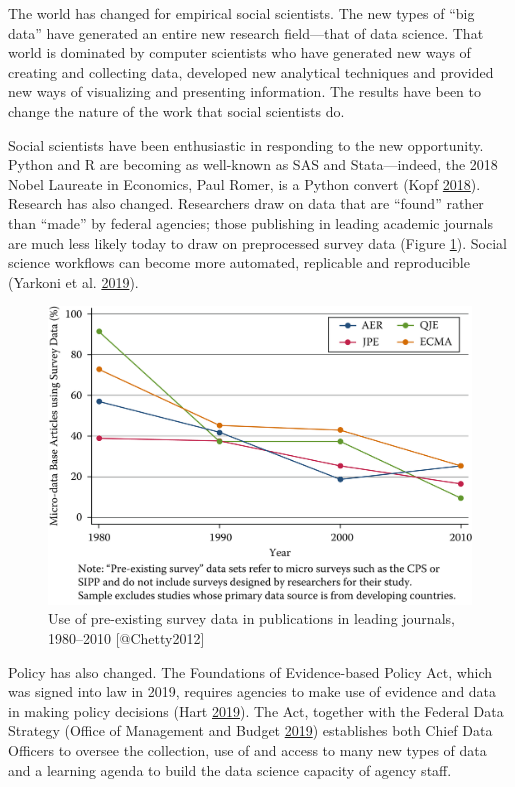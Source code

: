 \documentclass[]{krantz}
\begin{document}
The world has changed for empirical social scientists. The new types of
``big data'' have generated an entire new research field---that of data
science. That world is dominated by computer scientists who have
generated new ways of creating and collecting data, developed new
analytical techniques and provided new ways of visualizing and
presenting information. The results have been to change the nature of
the work that social scientists do.

Social scientists have been enthusiastic in responding to the new
opportunity. Python and R are becoming as well-known as SAS and
Stata---indeed, the 2018 Nobel Laureate in Economics, Paul Romer, is a
Python convert (Kopf \protect\hyperlink{ref-Kopf}{2018}). Research has
also changed. Researchers draw on data that are ``found'' rather than
``made'' by federal agencies; those publishing in leading academic
journals are much less likely today to draw on preprocessed survey data
(Figure \ref{fig:fig1}). Social science workflows can become more
automated, replicable and reproducible (Yarkoni et al.
\protect\hyperlink{ref-Yarkoni2019}{2019}).

\begin{figure}

{\centering \includegraphics[width=0.7\linewidth]{ChapterIntro/figures/Figure1} 

}

\caption{Use of pre-existing survey data in publications in leading journals, 1980--2010 [@Chetty2012]}\label{fig:fig1}
\end{figure}

Policy has also changed. The Foundations of Evidence-based Policy Act,
which was signed into law in 2019, requires agencies to make use of
evidence and data in making policy decisions (Hart
\protect\hyperlink{ref-Hart}{2019}). The Act, together with the Federal
Data Strategy (Office of Management and Budget
\protect\hyperlink{ref-OfficeofManagementandBudget}{2019}) establishes
both Chief Data Officers to oversee the collection, use of and access to
many new types of data and a learning agenda to build the data science
capacity of agency staff.
\end{document}
